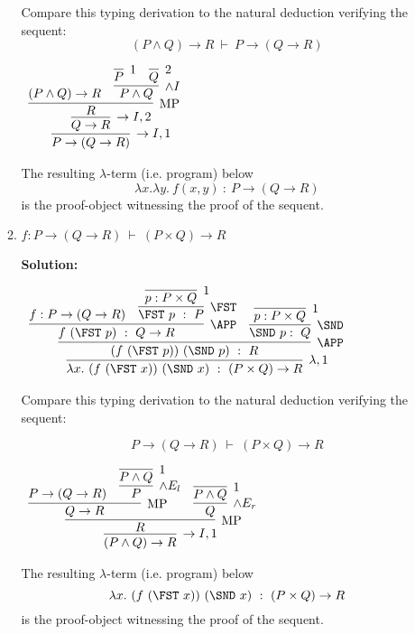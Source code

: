 \documentclass[11pt]{report}
\begin{document}
\begin{enumerate}
\begin{enumerate}
			Compare this typing derivation to the natural deduction verifying the sequent: 
			$$(P \land Q) \rightarrow R \ \vdash \ P \rightarrow (Q \rightarrow  R) $$

			\begin{mdframed}
				\begin{center}
					$\begin{array}{c}
						\infer[\to I,1]{P\to(Q\to R)}
							{\infer[\to I,2]{Q\to R}
								{\infer[\MP]{R}
									{(P\land Q) \to R
									&
									\infer[\land I]{P\land Q}
										{\infer[1]{P}{}
										&
										\infer[2]{Q}{}}}}}
					\end{array}$
				\end{center}
			\end{mdframed}

			The resulting $\lambda$-term (i.e. program) below
			$$ \lambda x. \lambda y. \ f(x,y) \ : \ P\to(Q\to R)$$
			is the proof-object witnessing the proof of the sequent.
		
		\newpage
		\item $f : P \rightarrow (Q \rightarrow  R) \ \vdash \ (P\times Q) \rightarrow  R $
		
		{\bf Solution:}
			\begin{mdframed}
				\begin{center}
					$\begin{array}{c}
						\infer[\lambda,1]{\lambda x. \ (f \ (\FST \ x)) \ (\SND \ x) \ : \ (P\times Q)\to R}
							{\infer[\APP]{(f \ (\FST \ p)) \ (\SND \ p) \ : \ R}
								{\infer[\APP]{f \ (\FST \ p) \ : \ Q\to R}
									{f : P \to (Q \to R)
									&
									\infer[\FST]{\FST \ p \ : \ P}
										{\infer[1]{p : P\times Q}
											{}}}
								&
								\infer[\SND]{\SND \ p : \ Q}
									{\infer[1]{p : P\times Q}
										{}}}}
					\end{array}$
				\end{center}				
			\end{mdframed}

			Compare this typing derivation to the natural deduction verifying the sequent: 

			$$P \rightarrow (Q \rightarrow  R) \ \vdash \ (P \times  Q) \rightarrow  R $$

			\begin{mdframed}
				\begin{center}
					$\begin{array}{c}
						\infer[\to I,1]{(P\land Q)\to R}
							{\infer[\MP]{R}
								{\infer[\MP]{Q\to R}
									{P \to (Q \to R)
									&
									\infer[\land E_{l}]{P}
										{\infer[1]{P\land Q}
											{}}}
								&
								\infer[\land E_{r}]{Q}
									{\infer[1]{P\land Q}
										{}}}}
					\end{array}$
				\end{center}				
			\end{mdframed}
			The resulting $\lambda$-term (i.e. program) below
			$$ \lambda x. \ (f \ (\FST \ x)) \ (\SND \ x) \ : \ (P\times Q)\to R$$
			is the proof-object witnessing the proof of the sequent.


\end{enumerate}
\end{enumerate}
\end{document}
